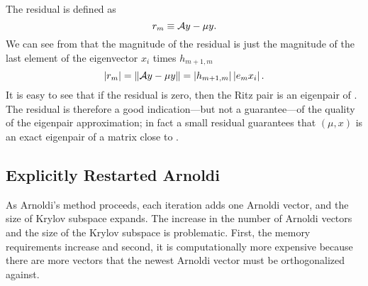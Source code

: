 The residual is defined as
\begin{equation}
    r_m \equiv \mathcal{A} y - \mu y.
\end{equation}
We can see from  that the magnitude of the residual is just the magnitude of the last element of the eigenvector $x_i$ times $h_{m+1,m}$
\begin{equation}
    \left|r_m\right| = \left\|\mathcal{A} y - \mu y\right\| = \left|h_{m+1,m}\right|\left|e_mx_i\right|.
    \label{eq:Residual}
\end{equation}
It is easy to see that if the residual is zero, then the Ritz pair is an eigenpair of \A.  The residual is therefore a good indication---but not a guarantee---of the quality of the eigenpair approximation; in fact a small residual guarantees that \mbox{$\left(\mu, x\right)$} is an exact eigenpair of a matrix close to \A{} \citep[see][]{Watkins:2002Funda-0}.

\subsection{Explicitly Restarted Arnoldi \label{sec:ERAM}}
\begin{comment}
The rate at which Arnoldi's method converges to good approximations of eigenpairs depends upon the starting vector.  Take for example starting with the eigenvector associated with the desired eigenvalue, i.e. largest eigenvalue in magnitude.  If we are so fortunate to know this in advance, the Krylov subspace calculated by Arnoldi's method will become invariant after just one iteration and the eigenpair will have been found exactly.  If we desire multiple, say $j$, eigenpairs and the starting vector is a linear combination of the $j$ eigenvectors associated with the desired eigenvalues then Arnoldi's method will be complete (the Krylov subspace will become invariant) in $j$ steps with all the desired eigenpairs known.

Unfortunately we don't know \emph{a priori} the desired eigenvector(s) and eigenvalue(s); if we did, we wouldn't need to perform the calculation.  We may not know beforehand a good guess to the solution, but after a few iterations of Arnoldi's method we have a better estimate of the desired solution than with what we started.  We could start Arnoldi's method over using the estimate of our desired eigenvectors (Arnoldi's Ritz vectors) as the new initial guess.
\end{comment}
As Arnoldi's method proceeds, each iteration adds one Arnoldi vector, and the size of Krylov subspace expands.  The increase in the number of Arnoldi vectors and the size of the Krylov subspace is problematic.  First, the memory requirements increase and second, it is computationally more expensive  because there are more vectors that the newest Arnoldi vector must be orthogonalized against.

